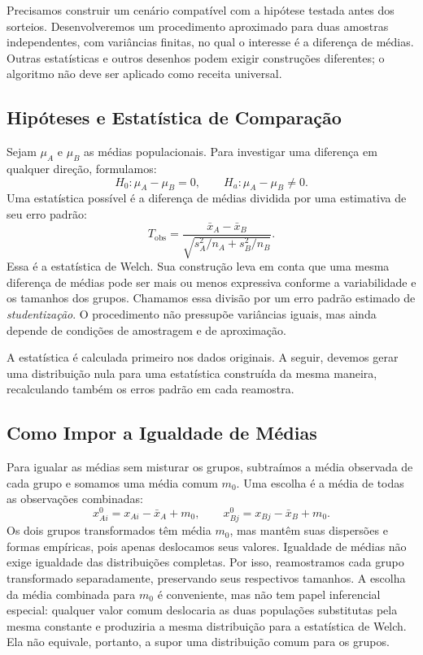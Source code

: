 \documentclass[12pt,a4paper]{article}
\begin{document}
Precisamos construir um cenário compatível com a hipótese testada antes dos sorteios. Desenvolveremos um procedimento aproximado para duas amostras independentes, com variâncias finitas, no qual o interesse é a diferença de médias. Outras estatísticas e outros desenhos podem exigir construções diferentes; o algoritmo não deve ser aplicado como receita universal.

\subsection{Hipóteses e Estatística de Comparação}
Sejam $\mu_A$ e $\mu_B$ as médias populacionais. Para investigar uma diferença em qualquer direção, formulamos:
\[
H_0:\mu_A-\mu_B=0,
\qquad H_a:\mu_A-\mu_B\ne0.
\]
Uma estatística possível é a diferença de médias dividida por uma estimativa de seu erro padrão:
\[
T_{\mathrm{obs}}=
\frac{\bar x_A-\bar x_B}
{\sqrt{s_A^2/n_A+s_B^2/n_B}}.
\]
Essa é a estatística de Welch. Sua construção leva em conta que uma mesma diferença de médias pode ser mais ou menos expressiva conforme a variabilidade e os tamanhos dos grupos. Chamamos essa divisão por um erro padrão estimado de \emph{studentização}. O procedimento não pressupõe variâncias iguais, mas ainda depende de condições de amostragem e de aproximação.

A estatística é calculada primeiro nos dados originais. A seguir, devemos gerar uma distribuição nula para uma estatística construída da mesma maneira, recalculando também os erros padrão em cada reamostra.

\subsection{Como Impor a Igualdade de Médias}
Para igualar as médias sem misturar os grupos, subtraímos a média observada de cada grupo e somamos uma média comum $m_0$. Uma escolha é a média de todas as observações combinadas:
\[
x_{Ai}^{0}=x_{Ai}-\bar x_A+m_0,
\qquad
x_{Bj}^{0}=x_{Bj}-\bar x_B+m_0.
\]
Os dois grupos transformados têm média $m_0$, mas mantêm suas dispersões e formas empíricas, pois apenas deslocamos seus valores. Igualdade de médias não exige igualdade das distribuições completas. Por isso, reamostramos cada grupo transformado separadamente, preservando seus respectivos tamanhos. A escolha da média combinada para $m_0$ é conveniente, mas não tem papel inferencial especial: qualquer valor comum deslocaria as duas populações substitutas pela mesma constante e produziria a mesma distribuição para a estatística de Welch. Ela não equivale, portanto, a supor uma distribuição comum para os grupos.
\end{document}
